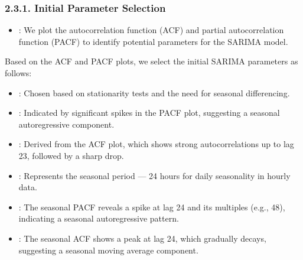 \documentclass[letterpaper,10pt,english]{sphinxmanual}
\begin{document}
\subsubsection{2.3.1. Initial Parameter Selection}
\label{\detokenize{index:initial-parameter-selection}}\begin{itemize}
\item {} 
\sphinxAtStartPar
{}: We plot the autocorrelation function (ACF) and partial autocorrelation function (PACF) to identify potential parameters for the SARIMA model.


\end{itemize}

\sphinxAtStartPar
Based on the ACF and PACF plots, we select the initial SARIMA parameters as follows:
\begin{itemize}
\item {} 
\sphinxAtStartPar
{}: Chosen based on stationarity tests and the need for seasonal differencing.

\item {} 
\sphinxAtStartPar
{}: Indicated by significant spikes in the PACF plot, suggesting a seasonal autoregressive component.

\item {} 
\sphinxAtStartPar
{}: Derived from the ACF plot, which shows strong autocorrelations up to lag 23, followed by a sharp drop.

\item {} 
\sphinxAtStartPar
{}: Represents the seasonal period — 24 hours for daily seasonality in hourly data.

\item {} 
\sphinxAtStartPar
{}: The seasonal PACF reveals a spike at lag 24 and its multiples (e.g., 48), indicating a seasonal autoregressive pattern.

\item {} 
\sphinxAtStartPar
{}: The seasonal ACF shows a peak at lag 24, which gradually decays, suggesting a seasonal moving average component.

\end{itemize}
\end{document}
